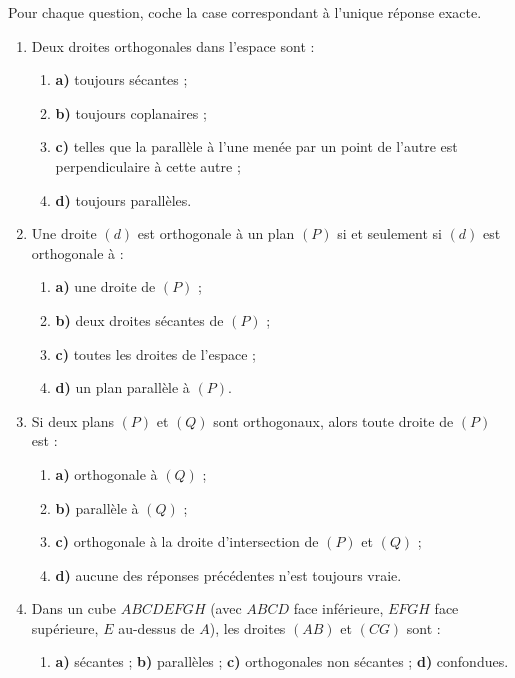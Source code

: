 \documentclass[11pt]{article}
\begin{document}
\begin{exercice}
Pour chaque question, coche la case correspondant à l'unique réponse exacte.
\begin{enumerate}
\item Deux droites orthogonales dans l'espace sont :
\begin{enumerate}
\item \textbf{a)} toujours sécantes ;
\item \textbf{b)} toujours coplanaires ;
\item \textbf{c)} telles que la parallèle à l'une menée par un point de l'autre est perpendiculaire à cette autre ;
\item \textbf{d)} toujours parallèles.
\end{enumerate}
\item Une droite $(d)$ est orthogonale à un plan $(P)$ si et seulement si $(d)$ est orthogonale à :
\begin{enumerate}
\item \textbf{a)} une droite de $(P)$ ;
\item \textbf{b)} deux droites sécantes de $(P)$ ;
\item \textbf{c)} toutes les droites de l'espace ;
\item \textbf{d)} un plan parallèle à $(P)$.
\end{enumerate}
\item Si deux plans $(P)$ et $(Q)$ sont orthogonaux, alors toute droite de $(P)$ est :
\begin{enumerate}
\item \textbf{a)} orthogonale à $(Q)$ ;
\item \textbf{b)} parallèle à $(Q)$ ;
\item \textbf{c)} orthogonale à la droite d'intersection de $(P)$ et $(Q)$ ;
\item \textbf{d)} aucune des réponses précédentes n'est toujours vraie.
\end{enumerate}
\item Dans un cube $ABCDEFGH$ (avec $ABCD$ face inférieure, $EFGH$ face supérieure, $E$ au-dessus de $A$), les droites $(AB)$ et $(CG)$ sont :
\begin{enumerate}
\item \textbf{a)} sécantes ; \quad \textbf{b)} parallèles ; \quad \textbf{c)} orthogonales non sécantes ; \quad \textbf{d)} confondues.
\end{enumerate}
\end{enumerate}
\end{exercice}
\end{document}
